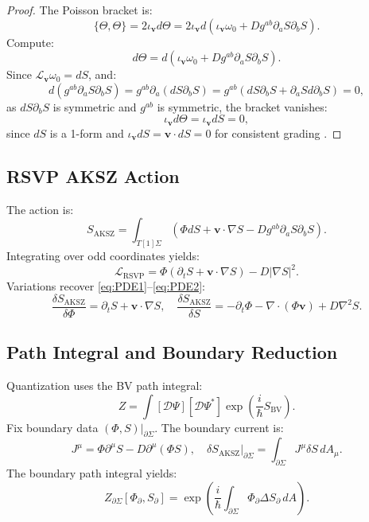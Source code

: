 \documentclass[12pt]{article}
\begin{document}
\begin{proof}
The Poisson bracket is:
\[
\{\Theta, \Theta\} = 2 \iota_{\mathbf{v}} d\Theta = 2 \iota_{\mathbf{v}} d \left( \iota_{\mathbf{v}} \omega_0 + D g^{ab} \partial_a S \partial_b S \right).
\]
Compute:
\[
d \Theta = d \left( \iota_{\mathbf{v}} \omega_0 + D g^{ab} \partial_a S \partial_b S \right).
\]
Since \(\mathcal{L}_{\mathbf{v}} \omega_0 = dS\), and:
\[
d (g^{ab} \partial_a S \partial_b S) = g^{ab} \partial_a (d S \partial_b S) = g^{ab} (d S \partial_b S + \partial_a S d \partial_b S) = 0,
\]
as \(d S \partial_b S\) is symmetric and \(g^{ab}\) is symmetric, the bracket vanishes:
\[
\iota_{\mathbf{v}} d \Theta = \iota_{\mathbf{v}} dS = 0,
\]
since \(dS\) is a 1-form and \(\iota_{\mathbf{v}} dS = \mathbf{v} \cdot dS = 0\) for consistent grading \cite{Alexandrov1997}.
\end{proof}

\subsection{RSVP AKSZ Action}

The action is:
\[
S_{\mathrm{AKSZ}} = \int_{T[1]\Sigma} \left( \Phi dS + \mathbf{v} \cdot \nabla S - D g^{ab} \partial_a S \partial_b S \right).
\]
Integrating over odd coordinates yields:
\[
\mathcal{L}_{\mathrm{RSVP}} = \Phi (\partial_t S + \mathbf{v} \cdot \nabla S) - D |\nabla S|^2.
\]
Variations recover \eqref{eq:PDE1}--\eqref{eq:PDE2}:
\[
\frac{\delta S_{\mathrm{AKSZ}}}{\delta \Phi} = \partial_t S + \mathbf{v} \cdot \nabla S, \quad \frac{\delta S_{\mathrm{AKSZ}}}{\delta S} = -\partial_t \Phi - \nabla \cdot (\Phi \mathbf{v}) + D \nabla^2 S.
\]

\subsection{Path Integral and Boundary Reduction}

Quantization uses the BV path integral:
\[
Z = \int [\mathcal{D}\Psi][\mathcal{D}\Psi^*] \exp\left( \frac{i}{\hbar} S_{\mathrm{BV}} \right).
\]
Fix boundary data \((\Phi, S)|_{\partial \Sigma}\). The boundary current is:
\[
J^\mu = \Phi \partial^\mu S - D \partial^\mu (\Phi S), \quad \delta S_{\mathrm{AKSZ}}|_{\partial \Sigma} = \int_{\partial \Sigma} J^\mu \delta S \, dA_\mu.
\]
The boundary path integral yields:
\[
Z_{\partial \Sigma}[\Phi_{\partial}, S_{\partial}] = \exp\left( \frac{i}{\hbar} \int_{\partial \Sigma} \Phi_{\partial} \Delta S_{\partial} \, dA \right).
\]
\end{document}
